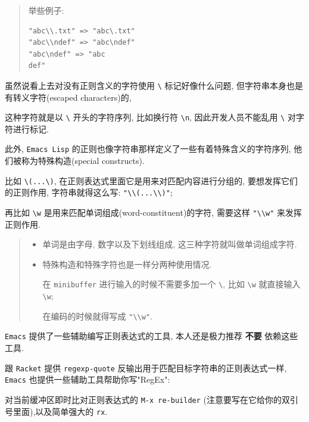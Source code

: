 \documentclass[11pt]{article}
\begin{document}
\begin{itemize}
\begin{quote}
举些例子:

\begin{verbatim}
"abc\\.txt" => "abc\.txt"
"abc\\ndef" => "abc\ndef"
"abc\ndef" => "abc
def"
\end{verbatim}
\end{quote}

虽然说看上去对没有正则含义的字符使用 \texttt{\textbackslash{}} 标记好像什么问题, 但字符串本身也是有转义字符(escaped characters)的,

这种字符就是以 \texttt{\textbackslash{}} 开头的字符序列, 比如换行符 \texttt{\textbackslash{}n}, 因此开发人员不能乱用 \texttt{\textbackslash{}} 对字符进行标记.

此外, \texttt{Emacs Lisp} 的正则也像字符串那样定义了一些有着特殊含义的字符序列, 他们被称为特殊构造(special constructs).

比如 \texttt{\textbackslash{}(...\textbackslash{})}, 在正则表达式里面它是用来对匹配内容进行分组的, 要想发挥它们的正则作用, 字符串就得这么写: \texttt{"\textbackslash{}\textbackslash{}(...\textbackslash{}\textbackslash{})"};

再比如 \texttt{\textbackslash{}w} 是用来匹配单词组成(word-constituent)的字符, 需要这样 \texttt{"\textbackslash{}\textbackslash{}w"} 来发挥正则作用.

\begin{quote}
\begin{itemize}
\item 单词是由字母, 数字以及下划线组成, 这三种字符就叫做单词组成字符.

\item 特殊构造和特殊字符也是一样分两种使用情况.

在 \texttt{minibuffer} 进行输入的时候不需要多加一个 \texttt{\textbackslash{}}, 比如 \texttt{\textbackslash{}w} 就直接输入 \texttt{\textbackslash{}w};

在编码的时候就得写成 \texttt{"\textbackslash{}\textbackslash{}w"}.
\end{itemize}
\end{quote}

\texttt{Emacs} 提供了一些辅助编写正则表达式的工具, 本人还是极力推荐 \textbf{不要} 依赖这些工具.

跟 \texttt{Racket} 提供 \texttt{regexp-quote} 反输出用于匹配目标字符串的正则表达式一样, \texttt{Emacs} 也提供一些辅助工具帮助你写"RegEx":

对当前缓冲区即时比对正则表达式的 \texttt{M-x re-builder} (注意要写在它给你的双引号里面),以及简单强大的 \texttt{rx}.


\end{itemize}
\end{document}
